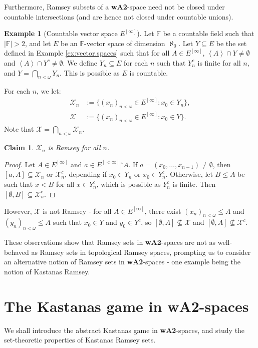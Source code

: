\documentclass[11pt,reqno]{amsart}
\theoremstyle{plain}
\numberwithin{equation}{section}
\newtheorem*{claim}{Claim}
\theoremstyle{definition}
\newtheorem{example}[theorem]{Example}
\renewcommand{\c}[1]{\left\langle #1 \right\rangle}
\newcommand{\cal}{\mathcal}
\newcommand{\restrictedto}{\mathord{\upharpoonright}}
\newcommand{\X}{\cal{X}}
\newenvironment{midproof}[1][Proof]
  {\begin{proof}[#1]\renewcommand{\qedsymbol}{$\blacksquare$}}
  {\end{proof}}
\begin{document}
Furthermore, Ramsey subsets of a \textbf{wA2}-space need not be closed under countable intersections (and are hence not closed under countable unions). 

\begin{example}[Countable vector space $E^{[\infty]}$]
    Let $\mathbb{F}$ be a countable field such that $|\mathbb{F}| > 2$, and let $E$ be an $\mathbb{F}$-vector space of dimension $\aleph_0$. Let $Y \subseteq E$ be the set defined in Example \ref{ex:vector.spaces} such that for all $A \in E^{[\infty]}$, $\c{A} \cap Y \neq \emptyset$ and $\c{A} \cap Y^c \neq \emptyset$. We define $Y_n \subseteq E$ for each $n$ such that $Y_n^c$ is finite for all $n$, and $Y = \bigcap_{n<\omega} Y_n$. This is possible as $E$ is countable.

    For each $n$, we let:
    \begin{align*}
        \X_n &:= \{(x_n)_{n<\omega} \in E^{[\infty]} : x_0 \in Y_n\}, \\
        \X &:= \{(x_n)_{n<\omega} \in E^{[\infty]} : x_0 \in Y\}.
    \end{align*}
    Note that $\X = \bigcap_{n<\omega} \X_n$. 
    
    \begin{claim}
        $\X_n$ is Ramsey for all $n$.
    \end{claim}

    \begin{midproof}
        Let $A \in E^{[\infty]}$ and $a \in E^{[<\infty]}\restrictedto A$. If $a = (x_0,\dots,x_{n-1}) \neq \emptyset$, then $[a,A] \subseteq \X_n$ or $\X_n^c$, depending if $x_0 \in Y_n$ or $x_0 \in Y_n^c$. Otherwise, let $B \leq A$ be such that $x < B$ for all $x \in Y_n^c$, which is possible as $Y_n^c$ is finite. Then $[\emptyset,B] \subseteq \X_n^c$.
    \end{midproof}

    However, $\X$ is not Ramsey - for all $A \in E^{[\infty]}$, there exist $(x_n)_{n<\omega} \leq A$ and $(y_n)_{n<\omega} \leq A$ such that $x_0 \in Y$ and $y_0 \in Y^c$, so $[\emptyset,A] \not\subseteq \X$ and $[\emptyset,A] \not\subseteq \X^c$.
\end{example}

These observations show that Ramsey sets in \textbf{wA2}-spaces are not as well-behaved as Ramsey sets in topological Ramsey spaces, prompting us to consider an alternative notion of Ramsey sets in \textbf{wA2}-spaces - one example being the notion of Kastanas Ramsey. 

\section{The Kastanas game in \textbf{wA2}-spaces}
We shall introduce the abstract Kastanas game in \textbf{wA2}-spaces, and study the set-theoretic properties of Kastanas Ramsey sets. 
\end{document}
